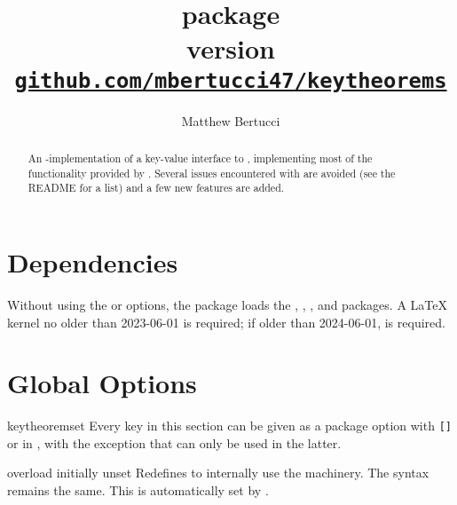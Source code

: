 \documentclass{ltxdoc}
\title{%
  \pkg{keytheorems} package \\[1ex]
  \large version \version \\[1ex]
  \href{https://github.com/mbertucci47/keytheorems}
    {\texttt{github.com/mbertucci47/keytheorems}}
  }
\author{Matthew Bertucci}
\newcommand{\bracks}[1]{\texttt{[#1]}}
\newcommand{\ttbraces}[1]{\braces{\texttt{#1}}}
\begin{document}
\maketitle

\begin{abstract}
An -implementation of a key-value interface to , implementing most of the functionality provided by . Several issues encountered with  are avoided (see the README for a list) and a few new features are added.
\end{abstract}

\tableofcontents

\section{Dependencies}

Without using the  or  options, the package loads the , , , and  packages. A \LaTeX{} kernel no older than 2023-06-01 is required; if older than 2024-06-01,  is required.
    
\section{Global Options}

\begin{docCommand}{keytheoremset}
  {}
Every key in this section can be given as a package option with \bracks{}\ttbraces{keytheorems} or in , with the exception that  can only be used in the latter.
\end{docCommand}

\begin{docKey}{overload}
  {}
  {initially unset}
Redefines  to internally use the  machinery. The syntax remains the same. This is automatically set by .
\end{docKey}
\end{document}
